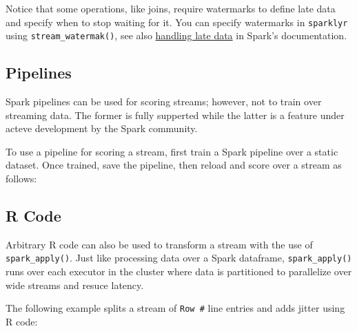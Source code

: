 \documentclass[]{book}
\newenvironment{Shaded}{\begin{snugshade}}{\end{snugshade}}
\newcommand{\KeywordTok}[1]{\textcolor[rgb]{0.13,0.29,0.53}{\textbf{#1}}}
\newcommand{\NormalTok}[1]{#1}
\newcommand{\OperatorTok}[1]{\textcolor[rgb]{0.81,0.36,0.00}{\textbf{#1}}}
\newcommand{\StringTok}[1]{\textcolor[rgb]{0.31,0.60,0.02}{#1}}
\theoremstyle{definition}
\theoremstyle{definition}
\theoremstyle{definition}
\theoremstyle{remark}
\begin{document}
Notice that some operations, like joins, require watermarks to define
late data and specify when to stop waiting for it. You can specify
watermarks in \texttt{sparklyr} using \texttt{stream\_watermak()}, see
also
\href{https://spark.apache.org/docs/latest/structured-streaming-programming-guide.html\#handling-late-data-and-watermarking}{handling
late data} in Spark's documentation.

\hypertarget{streams-pipelines}{%
\subsection{Pipelines}\label{streams-pipelines}}

Spark pipelines can be used for scoring streams; however, not to train
over streaming data. The former is fully supperted while the latter is a
feature under acteve development by the Spark community.

To use a pipeline for scoring a stream, first train a Spark pipeline
over a static dataset. Once trained, save the pipeline, then reload and
score over a stream as follows:

\begin{Shaded}
\end{Shaded}

\hypertarget{streams-r}{%
\subsection{R Code}\label{streams-r}}

Arbitrary R code can also be used to transform a stream with the use of
\texttt{spark\_apply()}. Just like processing data over a Spark
dataframe, \texttt{spark\_apply()} runs over each executor in the
cluster where data is partitioned to parallelize over wide streams and
resuce latency.

The following example splits a stream of \texttt{Row\ \#} line entries
and adds jitter using R code:
\end{document}
